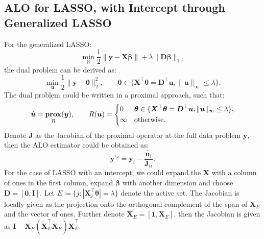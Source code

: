 \documentclass[11pt]{article}
\newcommand{\bu}{\bm{u}}
\newcommand{\by}{\bm{y}}
\newcommand{\bD}{\bm{D}}
\newcommand{\bI}{\bm{I}}
\newcommand{\bJ}{\bm{J}}
\newcommand{\bX}{\bm{X}}
\newcommand{\bbeta}{\bm{\beta}}
\newcommand{\btheta}{\bm{\theta}}
\newcommand{\bZero}{\bm{0}}
\newcommand{\bOne}{\bm{1}}
\DeclareMathOperator{\bprox}{\mathbf{prox}}
\begin{document}
\subsection{ALO for LASSO, with Intercept through Generalized LASSO}
For the generalized LASSO:
	\begin{equation}
	\min\limits_{\bbeta}\frac{1}{2}\|\by-\bX\bbeta\|+\lambda\|\bD\bbeta\|_{1},
	\end{equation}
the dual problem can be derived as:
	\begin{equation}
	\min\limits_{\bu}\frac{1}{2}\|\by-\btheta\|_{2}^{2},\qquad\btheta\in \{\bX^{\top}\btheta = \bD^{\top}\bu, \|\bu\|_{\infty} \leq \lambda\}.
	\end{equation}
The dual problem could be written in a proximal approach, such that: \[\hat{\bu} = \bprox_{R}(\by),\qquad R(\bu) =\begin{dcases}
0 & \btheta \in \{\bX^{\top}\btheta = \bD^{\top}\bu, \|\bu\|_{\infty} \leq \lambda\},\\
\infty & \text{otherwise.}
\end{dcases}\] Denote $\bJ$ as the Jacobian of the proximal operator at the full data problem $\by$, then the ALO estimator could be obtained as: 
	\begin{equation}
	\by^{\setminus i} = \by_{i} - \frac{\hat{\bu}_{i}}{\bJ_{ii}}.
	\end{equation}
For the case of LASSO with an intercept, we could expand the $\bX$ with a column of ones in the first column, expand $\bbeta$ with another dimension and choose $\bD = [\bZero, \bI]$. Let \(E\coloneqq\{j:|\bX_{j}^{\top}\btheta| = \lambda \}\) denote the active set. The Jacobian is locally given as the projection onto the orthogonal complement of the span of $\bX_{E}$ and the vector of ones. Further denote $\tilde{\bX}_{E} = [\bOne, \bX_{E}]$, then the Jacobian is given as $\bI - \tilde{\bX_{E}}(\tilde{\bX}_{E}^{\top}\tilde{\bX}_{E})\tilde{\bX}_{E}^{\top}$.
\end{document}
